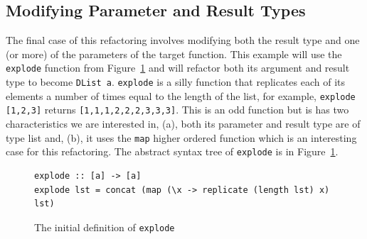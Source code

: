 \subsection{Modifying Parameter and Result Types}

The final case of this refactoring involves modifying both the result type and one (or more) of the parameters of the target function. This example will use the \texttt{explode} function from Figure~\ref{explode} and will refactor both its argument and result type to become \texttt{DList a}. \texttt{explode} is a silly function that replicates each of its elements a number of times equal to the length of the list, for example, \texttt{explode [1,2,3]} returns \texttt{[1,1,1,2,2,2,3,3,3]}. This is an odd function but is has two characteristics we are interested in, (a), both its parameter and result type are of type list and, (b), it uses the \texttt{map} higher ordered function which is an interesting case for this refactoring. The abstract syntax tree of \texttt{explode} is in Figure~\ref{explode}.

\begin{figure}[t]
\begin{lstlisting}
explode :: [a] -> [a]
explode lst = concat (map (\x -> replicate (length lst) x) lst)
\end{lstlisting}
\caption{The initial definition of \texttt{explode}}
\label{explode}
\end{figure}


